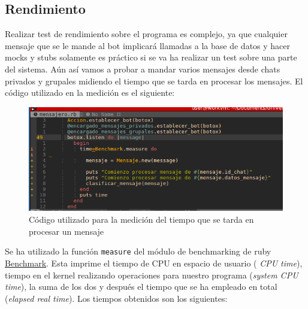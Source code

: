 \subsection{Rendimiento}
Realizar test de rendimiento sobre el programa es complejo, ya que cualquier mensaje que se le mande al bot implicará llamadas a la base de datos y hacer mocks y stubs solamente es práctico si se va ha realizar un test sobre una parte del sistema. Aún así vamos a probar a mandar varios mensajes desde chats privados y grupales midiendo el tiempo que se tarda en procesar los mensajes. El código utilizado en la medición es el siguiente:
\begin{figure}[H] %
\centering
\includegraphics[scale=0.6]{imagenes/random/rend1.png}  %
\caption{Código utilizado para la medición del tiempo que se tarda en procesar un mensaje}\label{figura94}
\end{figure}



Se ha utilizado la función \texttt{measure} del módulo de benchmarking de ruby \href{https://ruby-doc.org/stdlib-2.0.0/libdoc/benchmark/rdoc/Benchmark.html}{Benchmark}. Esta imprime el tiempo de CPU en espacio de usuario (\textit{ CPU time}), tiempo en el kernel realizando operaciones para nuestro programa (\textit{system CPU time}), la suma de los dos  y después el tiempo que se ha empleado en total (\textit{elapsed real time}). Los tiempos obtenidos son los siguientes:

